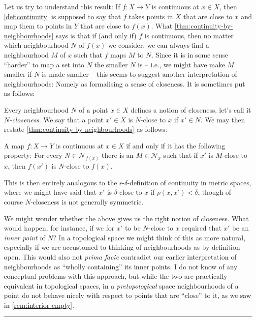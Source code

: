 \documentclass[article, a4paper, 11pt, oneside]{memoir}
\numberwithin{equation}{chapter}
\newcommand{\calN}{\mathcal{N}}
\newcommand{\nhoods}[1]{\calN_{#1}}
\newenvironment{displaytheorem}{%
    \begin{displayquote}\itshape%
}{%
    \end{displayquote}%
}
\newcommand\fleuronbreak{\fancybreak{\textcolor{linkcolor}{\adfhangingflatleafleft}}}
\begin{document}
Let us try to understand this result: If $f \colon X \to Y$ is continuous at $x \in X$, then \cref{def:continuity} is supposed to say that $f$ takes points in $X$ that are close to $x$ and map them to points in $Y$ that are close to $f(x)$. What \cref{thm:continuity-by-neighbourhoods} says is that if (and only if) $f$ is continuous, then no matter which neighbourhood $N$ of $f(x)$ we consider, we can always find a neighbourhood $M$ of $x$ such that $f$ maps $M$ to $N$. Since it is in some sense \enquote{harder} to map a set into $N$ the smaller $N$ is -- i.e., we might have make $M$ smaller if $N$ is made smaller -- this seems to suggest another interpretation of neighbourhoods: Namely as formalising a sense of closeness. It is sometimes put as follows:

Every neighbourhood $N$ of a point $x \in X$ defines a notion of closeness, let's call it \emph{$N$-closeness}. We say that a point $x' \in X$ is $N$-close to $x$ if $x' \in N$. We may then restate \cref{thm:continuity-by-neighbourhoods} as follows:
%
\begin{displaytheorem}
    A map $f \colon X \to Y$ is continuous at $x \in X$ if and only if it has the following property: For every $N \in \nhoods{f(x)}$ there is an $M \in \nhoods{x}$ such that if $x'$ is $M$-close to $x$, then $f(x')$ is $N$-close to $f(x)$.
\end{displaytheorem}
%
This is then entirely analogous to the $\epsilon$-$\delta$-definition of continuity in metric spaces, where we might have said that $x'$ is $\delta$-close to $x$ if $\rho(x,x') < \delta$, though of course $N$-closeness is not generally symmetric.

We might wonder whether the above gives us the right notion of closeness. What would happen, for instance, if we for $x'$ to be $N$-close to $x$ required that $x'$ be an \emph{inner point} of $N$? In a topological space we might think of this as more natural, especially if we are accustomed to thinking of neighbourhoods as by definition open. This would also not \emph{prima facie} contradict our earlier interpretation of neighbourhoods as \enquote{wholly containing} its inner points. I do not know of any conceptual problems with this approach, but while the two are practically equivalent in topological spaces, in a \emph{pretopological} space neighbourhoods of a point do not behave nicely with respect to points that are \enquote{close} to it, as we saw in \cref{rem:interior-empty}.

\fleuronbreak
\end{document}
